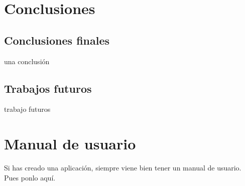 \documentclass[a4paper, 12pt, oneside]{book}
\begin{document}

\cleardoublepage
\chapter{Conclusiones}
\label{chap:conclusiones}


\section{Conclusiones finales}
\label{sec:consecucion-objetivos}

una conclusión

\section{Trabajos futuros}
\label{sec:trabajos_futuros}

trabajo futuros





\cleardoublepage
\appendix
\chapter{Manual de usuario}
\label{app:manual}

Si has creado una aplicación, siempre viene bien tener un manual de usuario.
Pues ponlo aquí.


\cleardoublepage
\end{document}
